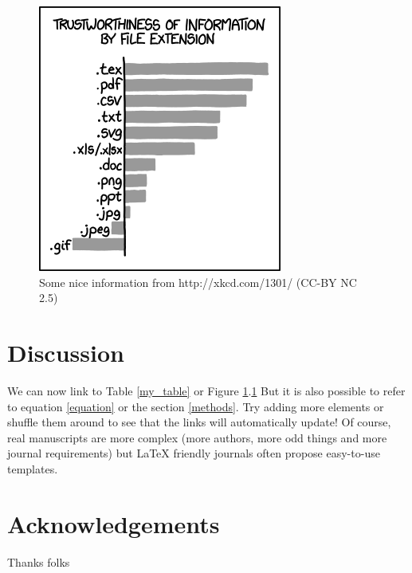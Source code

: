 \documentclass[12pt,letterpaper]{article}
\begin{document}
\begin{figure}[!htpb]
\centering
    \includegraphics{file_extension_xkcd_1301.png} %
\caption{Some nice information from http://xkcd.com/1301/ (CC-BY NC 2.5)} %
\label{my_figure}
\end{figure}

\newpage %

\section{Discussion}
We can now link to Table \ref{my_table} or Figure \ref{my_figure}.\ref{my_figure}
But it is also possible to refer to equation \ref{equation} or the section \ref{methods}.
Try adding more elements or shuffle them around to see that the links will automatically update!
Of course, real manuscripts are more complex (more authors, more odd things and more journal requirements) but LaTeX friendly journals often propose easy-to-use templates.

\section{Acknowledgements}
Thanks folks






\end{document}
